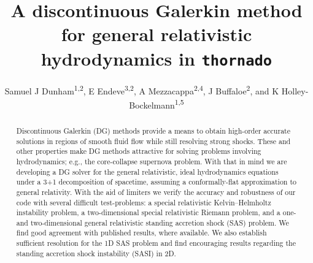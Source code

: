 \documentclass[letterpaper]{jpconf}
\newcommand{\thornado}{\texttt{thornado}}
\begin{document}
\nocite{*}

\title{A discontinuous Galerkin method for general relativistic hydrodynamics in \thornado}

\author{Samuel J Dunham\textsuperscript{1,2}, E Endeve\textsuperscript{3,2}, A Mezzacappa\textsuperscript{2,4}, J Buffaloe\textsuperscript{2}, and K Holley-Bockelmann\textsuperscript{1,5}}

\address{\textsuperscript{1} Department of Astronomy, Vanderbilt University, 6301 Stevenson Center Lane, Nashville TN, 37235, USA}
\address{\textsuperscript{2} Department of Physics and Astronomy, University of Tennessee-Knoxville, Nielsen Physics Building, 401, 1408 Circle Drive, Knoxville TN, 37996, USA}
\address{\textsuperscript{3} Computer Science and Mathematics Division, Oak Ridge National Laboratory, Oak Ridge, TN 37831, USA}
\address{\textsuperscript{4} Joint Institute for Computational Sciences, Oak Ridge National Laboratory, Oak Ridge, TN 37831, USA}
\address{\textsuperscript{5} Department of Life and Physical Sciences, Fisk University, 1000 17\textsuperscript{th} Ave N, Nashville TN, 37208, USA}


\begin{abstract}
Discontinuous Galerkin (DG) methods provide a means to obtain high-order accurate solutions in regions of smooth fluid flow while still resolving strong shocks. These and other properties make DG methods attractive for solving problems involving hydrodynamics; e.g., the core-collapse supernova problem. With that in mind we are developing a DG solver for the general relativistic, ideal hydrodynamics equations under a 3+1 decomposition of spacetime, assuming a conformally-flat approximation to general relativity. With the aid of limiters we verify the accuracy and robustness of our code with several difficult test-problems: a special relativistic Kelvin--Helmholtz instability problem, a two-dimensional special relativistic Riemann problem, and a one- and two-dimensional general relativistic standing accretion shock (SAS) problem. We find good agreement with published results, where available. We also establish sufficient resolution for the 1D SAS problem and find encouraging results regarding the standing accretion shock instability (SASI) in 2D.

\end{abstract}
\end{document}
